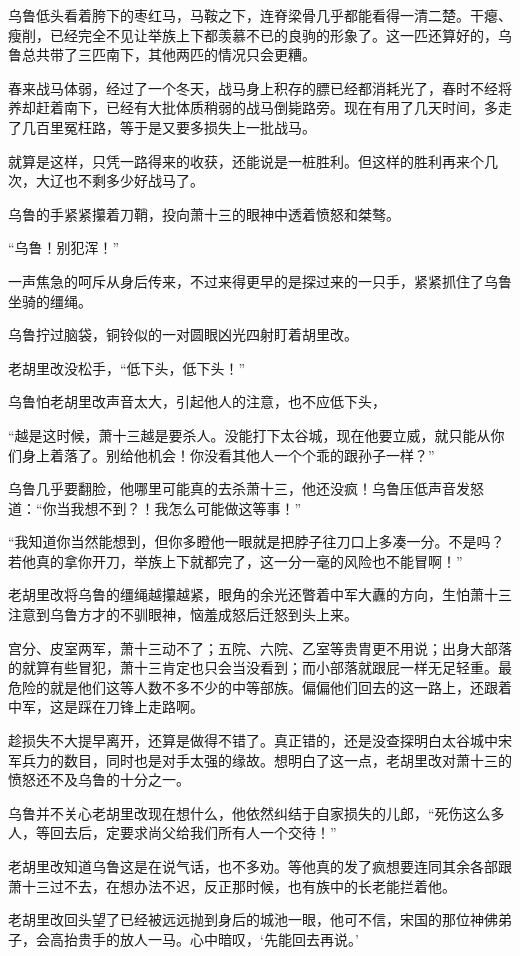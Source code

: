 乌鲁低头看着胯下的枣红马，马鞍之下，连脊梁骨几乎都能看得一清二楚。干瘪、瘦削，已经完全不见让举族上下都羡慕不已的良驹的形象了。这一匹还算好的，乌鲁总共带了三匹南下，其他两匹的情况只会更糟。

春来战马体弱，经过了一个冬天，战马身上积存的膘已经都消耗光了，春时不经将养却赶着南下，已经有大批体质稍弱的战马倒毙路旁。现在有用了几天时间，多走了几百里冤枉路，等于是又要多损失上一批战马。

就算是这样，只凭一路得来的收获，还能说是一桩胜利。但这样的胜利再来个几次，大辽也不剩多少好战马了。

乌鲁的手紧紧攥着刀鞘，投向萧十三的眼神中透着愤怒和桀骜。

“乌鲁！别犯浑！”

一声焦急的呵斥从身后传来，不过来得更早的是探过来的一只手，紧紧抓住了乌鲁坐骑的缰绳。

乌鲁拧过脑袋，铜铃似的一对圆眼凶光四射盯着胡里改。

老胡里改没松手，“低下头，低下头！”

乌鲁怕老胡里改声音太大，引起他人的注意，也不应低下头，

“越是这时候，萧十三越是要杀人。没能打下太谷城，现在他要立威，就只能从你们身上着落了。别给他机会！你没看其他人一个个乖的跟孙子一样？”

乌鲁几乎要翻脸，他哪里可能真的去杀萧十三，他还没疯！乌鲁压低声音发怒道：“你当我想不到？！我怎么可能做这等事！”

“我知道你当然能想到，但你多瞪他一眼就是把脖子往刀口上多凑一分。不是吗？若他真的拿你开刀，举族上下就都完了，这一分一毫的风险也不能冒啊！”

老胡里改将乌鲁的缰绳越攥越紧，眼角的余光还瞥着中军大纛的方向，生怕萧十三注意到乌鲁方才的不驯眼神，恼羞成怒后迁怒到头上来。

宫分、皮室两军，萧十三动不了；五院、六院、乙室等贵胄更不用说；出身大部落的就算有些冒犯，萧十三肯定也只会当没看到；而小部落就跟屁一样无足轻重。最危险的就是他们这等人数不多不少的中等部族。偏偏他们回去的这一路上，还跟着中军，这是踩在刀锋上走路啊。

趁损失不大提早离开，还算是做得不错了。真正错的，还是没查探明白太谷城中宋军兵力的数目，同时也是对手太强的缘故。想明白了这一点，老胡里改对萧十三的愤怒还不及乌鲁的十分之一。

乌鲁并不关心老胡里改现在想什么，他依然纠结于自家损失的儿郎，“死伤这么多人，等回去后，定要求尚父给我们所有人一个交待！”

老胡里改知道乌鲁这是在说气话，也不多劝。等他真的发了疯想要连同其余各部跟萧十三过不去，在想办法不迟，反正那时候，也有族中的长老能拦着他。

老胡里改回头望了已经被远远抛到身后的城池一眼，他可不信，宋国的那位神佛弟子，会高抬贵手的放人一马。心中暗叹，‘先能回去再说。’

